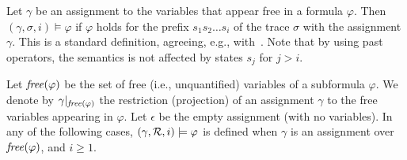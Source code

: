 

Let $\gamma$ be an assignment to the variables that appear
free in a formula $\varphi$.
Then $( \gamma ,  \sigma, i ) \models \varphi$
if $\varphi$ holds for the prefix $s_1 s_2 \ldots s_i$ of 
the trace $\sigma$
with the assignment $\gamma$. This is a standard definition,
agreeing, e.g., with~\cite{Basin}. Note that by using past %
operators, the semantics is not affected by
states $s_j$ for $j>i$.
%
\fi

Let $\mathit{free} ( \varphi )$ be the set of free (i.e., unquantified) variables of a
subformula $\varphi$. 
We denote by $\gamma |_{\mathit{free} ( \varphi )}$ the restriction (projection) of
an assignment $\gamma$ to the free variables appearing in $\varphi$.
%
Let $\epsilon$ be the empty assignment (with no variables). 
%
In any of the following cases, $( \gamma,  {\cal R} , i ) \models \varphi$
is defined when $\gamma$ is an
assignment over $\mathit{free} ( \varphi )$, and $i\ge 1$.

